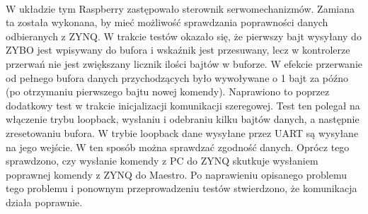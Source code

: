 \paragraph*{}
W układzie tym Raspberry zastępowało sterownik serwomechanizmów. Zamiana ta została wykonana, by mieć możliwość sprawdzania poprawności danych odbieranych z ZYNQ. W trakcie testów okazało się, że pierwszy bajt wysyłany do ZYBO jest wpisywany do bufora i wskaźnik jest przesuwany, lecz w kontrolerze przerwań nie jest zwiększany licznik ilości bajtów w buforze. W efekcie przerwanie od pełnego bufora danych przychodzących było wywoływane o 1 bajt za późno (po otrzymaniu pierwszego bajtu nowej komendy). Naprawiono to poprzez dodatkowy test w trakcie inicjalizacji komunikacji szeregowej. Test ten polegał na włączenie trybu loopback, wysłaniu i odebraniu kilku bajtów danych, a następnie zresetowaniu bufora. W trybie loopback dane wysyłane przez UART są wysyłane na jego wejście. W ten sposób można sprawdzać zgodność danych. Oprócz tego sprawdzono, czy wysłanie komendy z PC do ZYNQ skutkuje wysłaniem poprawnej komendy z ZYNQ do Maestro. Po naprawieniu opisanego problemu tego problemu i ponownym przeprowadzeniu testów stwierdzono, że komunikacja działa poprawnie.